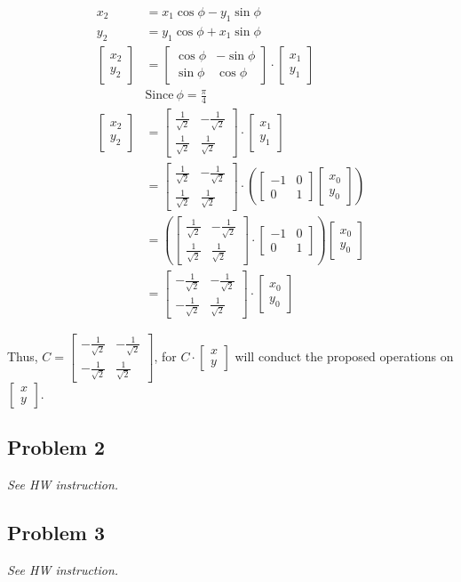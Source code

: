 \documentclass[11pt]{article}
\providecommand{\qbm}[1]{\begin{bmatrix} #1 \end{bmatrix}}
\begin{document}
\begin{align*}
    x_2 &= x_1 \cos \phi - y_1 \sin \phi \\
    y_2 &= y_1 \cos \phi + x_1 \sin \phi \\
    \qbm{x_2 \\ y_2} &= \qbm{\cos \phi & -\sin \phi \\ \sin \phi & \cos \phi} \cdot \qbm{x_1 \\ y_1} \\
    &\text{Since}\ \phi = \frac{\pi}{4} \\
    \qbm{x_2 \\ y_2} &= \qbm{\frac{1}{\sqrt{2}} & -\frac{1}{\sqrt{2}}  \\ \frac{1}{\sqrt{2}}  & \frac{1}{\sqrt{2}} } \cdot \qbm{x_1 \\ y_1} \\
    &= \qbm{\frac{1}{\sqrt{2}} & -\frac{1}{\sqrt{2}}  \\ \frac{1}{\sqrt{2}}  & \frac{1}{\sqrt{2}} } \cdot (\qbm{-1 & 0 \\ 0 & 1} \qbm{x_0 \\ y_0}) \\
    &= (\qbm{\frac{1}{\sqrt{2}} & -\frac{1}{\sqrt{2}}  \\ \frac{1}{\sqrt{2}}  & \frac{1}{\sqrt{2}} } \cdot \qbm{-1 & 0 \\ 0 & 1}) \qbm{x_0 \\ y_0} \\
    &= \qbm{-\frac{1}{\sqrt{2}} & -\frac{1}{\sqrt{2}} \\ -\frac{1}{\sqrt{2}} & \frac{1}{\sqrt{2}}} \cdot \qbm{x_0 \\ y_0}
\end{align*}

Thus, $C = \qbm{-\frac{1}{\sqrt{2}} & -\frac{1}{\sqrt{2}} \\ -\frac{1}{\sqrt{2}} & \frac{1}{\sqrt{2}}}$, for $C \cdot \qbm{x \\ y}$ will conduct the proposed operations on $\qbm{x \\ y}$.

\subsection*{Problem 2}
\textit{See HW instruction.}\newline

\subsection*{Problem 3}
\textit{See HW instruction.}\newline
\end{document}
